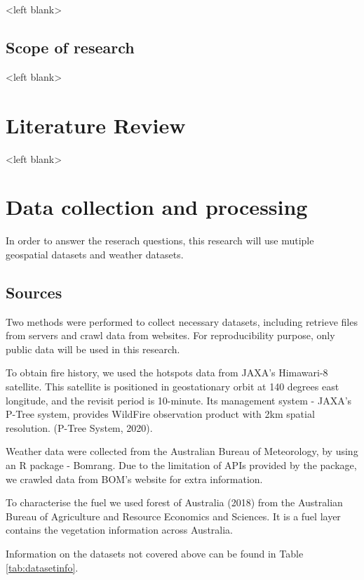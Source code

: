 \documentclass{monashthesis}
\begin{document}
\textless{}left blank\textgreater{}

\section{Scope of research}\label{scope-of-research}

\textless{}left blank\textgreater{}

\chapter{Literature Review}\label{literature-review}

\textless{}left blank\textgreater{}

\chapter{Data collection and
processing}\label{data-collection-and-processing}

In order to answer the reserach questions, this research will use
mutiple geospatial datasets and weather datasets.

\section{Sources}\label{sources}

Two methods were performed to collect necessary datasets, including
retrieve files from servers and crawl data from websites. For
reproducibility purpose, only public data will be used in this research.

To obtain fire history, we used the hotspots data from JAXA's Himawari-8
satellite. This satellite is positioned in geostationary orbit at 140
degrees east longitude, and the revisit period is 10-minute. Its
management system - JAXA's P-Tree system, provides WildFire observation
product with 2km spatial resolution. (P-Tree System, 2020).

Weather data were collected from the Australian Bureau of Meteorology,
by using an R package - Bomrang. Due to the limitation of APIs provided
by the package, we crawled data from BOM's website for extra
information.

To characterise the fuel we used forest of Australia (2018) from the
Australian Bureau of Agriculture and Resource Economics and Sciences. It
is a fuel layer contains the vegetation information across Australia.

Information on the datasets not covered above can be found in Table
\ref{tab:datasetinfo}.
\end{document}
